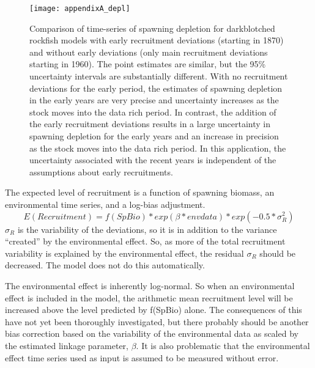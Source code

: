 \begin{figure}[H]
	\begin{center}
		\texttt{[image: appendixA\_depl]}\\
	\end{center}
	\caption{Comparison of time-series of spawning depletion for darkblotched rockfish models with early recruitment deviations (starting in 1870) and without early deviations (only main recruitment deviations starting in 1960). The point estimates are similar, but the 95\% uncertainty intervals are substantially different. With no recruitment deviations for the early period, the estimates of spawning depletion in the early years are very precise and uncertainty increases as the stock moves into the data rich period. In contrast, the addition of the early recruitment deviations results in a large uncertainty in spawning depletion for the early years and an increase in precision as the stock moves into the data rich period. In this application, the uncertainty associated with the recent years is independent of the assumptions about early recruitments.}
	\label{fig:depl}
\end{figure}

The expected level of recruitment is a function of spawning biomass, an environmental time series, and a log-bias adjustment.
\begin{equation}
	E(Recruitment) = f(SpBio) * exp(\beta*envdata) * exp(-0.5*\sigma_R^2)
\end{equation}
$\sigma_R$ is the variability of the deviations, so it is in addition to the variance ``created'' by the environmental effect. So, as more of the total recruitment variability is explained by the environmental effect, the residual $\sigma_R$ should be decreased.  The model does not do this automatically.

The environmental effect is inherently log-normal. So when an environmental effect is included in the model, the arithmetic mean recruitment level will be increased above the level predicted by f(SpBio) alone. The consequences of this have not yet been thoroughly investigated, but there probably should be another bias correction based on the variability of the environmental data as scaled by the estimated linkage parameter, $\beta$. It is also problematic that the environmental effect time series used as input is assumed to be measured without error.

